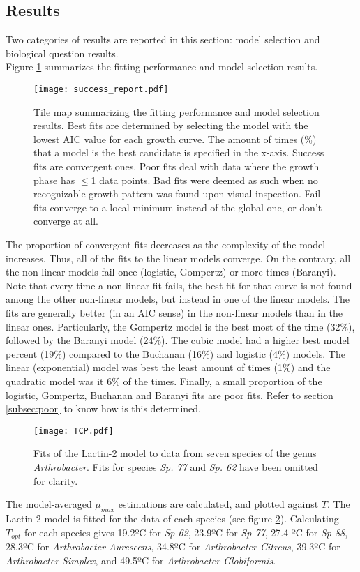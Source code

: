 \documentclass[titlepage,11pt]{article}
\begin{document}
\begin{linenumbers}
			\section{Results}
			Two categories of results are reported in this section: model selection and biological question results. \\
			Figure \ref{fig:success_report} summarizes the fitting performance and model selection results.
			\begin{figure}[h!]
				\texttt{[image: success\_report.pdf]}
				\centering
				\caption{Tile map summarizing the fitting performance and model selection results. Best fits are determined by selecting the model with the lowest AIC value for each growth curve. The amount of times (\%) that a model is the best candidate is specified in the x-axis. Success fits are convergent ones. Poor fits deal with data where the growth phase has $ \leq $1 data points. Bad fits were deemed as such when no recognizable growth pattern was found upon visual inspection. Fail fits converge to a local minimum instead of the global one, or don't converge at all.}
				\label{fig:success_report}
			\end{figure}
			The proportion of convergent fits decreases as the complexity of the model increases. Thus, all of the fits to the linear models converge. On the contrary, all the non-linear models fail once (logistic, Gompertz) or more times (Baranyi). Note that every time a non-linear fit fails, the best fit for that curve is not found among the other non-linear models, but instead in one of the linear models. The fits are generally better (in an AIC sense) in the non-linear models than in the linear ones. Particularly, the Gompertz model is the best most of the time (32\%), followed by the Baranyi model (24\%). The cubic model had a higher best model percent (19\%) compared to the Buchanan (16\%) and logistic (4\%) models. The linear (exponential) model was best the least amount of times (1\%) and the quadratic model was it 6\% of the times. Finally, a small proportion of the logistic, Gompertz, Buchanan and Baranyi fits are poor fits. Refer to section \ref{subsec:poor} to know how is this determined.\\
			\begin{figure}[h]
				\texttt{[image: TCP.pdf]}
				\centering
				\caption{Fits of the Lactin-2 model to data from seven species of the genus \textit{Arthrobacter}. Fits for species \textit{Sp. 77} and \textit{Sp. 62} have been omitted for clarity.}
				\label{fig:TCP}
			\end{figure}
			The model-averaged $ \mu_{max} $  estimations are calculated, and plotted against $ T $. The Lactin-2 model is fitted for the data of each species (see figure \ref{fig:TCP}). Calculating $ T_{opt} $ for each species gives 19.2ºC for \textit{Sp 62}, 23.9ºC for \textit{Sp 77}, 27.4 ºC for \textit{Sp 88}, 28.3ºC for \textit{Arthrobacter Aurescens}, 34.8ºC for \textit{Arthrobacter Citreus}, 39.3ºC for \textit{Arthrobacter Simplex}, and 49.5ºC for \textit{Arthrobacter Globiformis}. 

\end{linenumbers}
\end{document}
